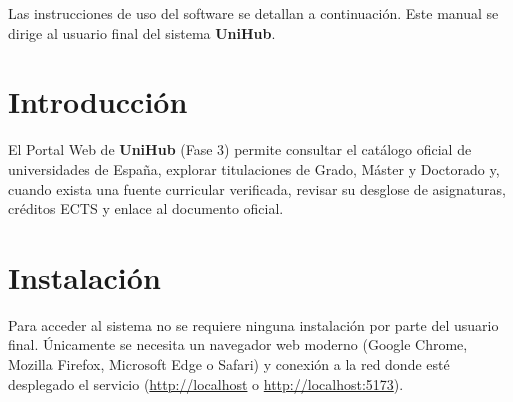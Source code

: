 Las instrucciones de uso del software se detallan a continuación. Este manual se dirige al usuario final del sistema \textbf{UniHub}.

\section{Introducción}
El Portal Web de \textbf{UniHub} (Fase 3) permite consultar el catálogo oficial de universidades de España, explorar titulaciones de Grado, Máster y Doctorado y, cuando exista una fuente curricular verificada, revisar su desglose de asignaturas, créditos ECTS y enlace al documento oficial.

\section{Instalación}
Para acceder al sistema no se requiere ninguna instalación por parte del usuario final. Únicamente se necesita un navegador web moderno (Google Chrome, Mozilla Firefox, Microsoft Edge o Safari) y conexión a la red donde esté desplegado el servicio (\url{http://localhost} o \url{http://localhost:5173}).

